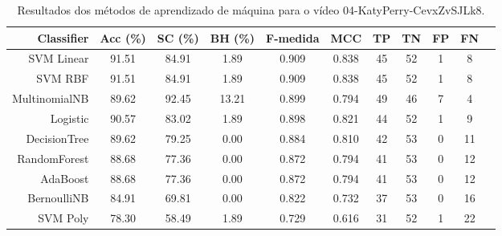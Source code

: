 \begin{table}[!htb]
\centering
\caption{Resultados dos métodos de aprendizado de máquina para o vídeo 04-KatyPerry-CevxZvSJLk8.}
\label{tab:04-KatyPerry-CevxZvSJLk8}
\begin{tabular}{r|c|c|c|c|c|c|c|c|c|c}
\hline\hline
Classifier & Acc (\%) & SC (\%) & BH (\%) & F-medida & MCC & TP & TN & FP & FN \\ \hline
SVM Linear & 91.51 & 84.91 & 1.89 & 0.909 & 0.838 & 45 & 52 & 1 & 8 \\ 
SVM RBF & 91.51 & 84.91 & 1.89 & 0.909 & 0.838 & 45 & 52 & 1 & 8 \\ 
MultinomialNB & 89.62 & 92.45 & 13.21 & 0.899 & 0.794 & 49 & 46 & 7 & 4 \\ 
Logistic & 90.57 & 83.02 & 1.89 & 0.898 & 0.821 & 44 & 52 & 1 & 9 \\ 
DecisionTree & 89.62 & 79.25 & 0.00 & 0.884 & 0.810 & 42 & 53 & 0 & 11 \\ 
RandomForest & 88.68 & 77.36 & 0.00 & 0.872 & 0.794 & 41 & 53 & 0 & 12 \\ 
AdaBoost & 88.68 & 77.36 & 0.00 & 0.872 & 0.794 & 41 & 53 & 0 & 12 \\ 
BernoulliNB & 84.91 & 69.81 & 0.00 & 0.822 & 0.732 & 37 & 53 & 0 & 16 \\ 
SVM Poly & 78.30 & 58.49 & 1.89 & 0.729 & 0.616 & 31 & 52 & 1 & 22 \\ 
\hline\hline
\end{tabular}
\end{table}
